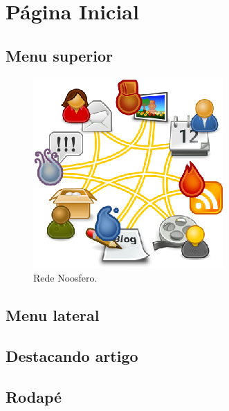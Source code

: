 \chapter{Página Inicial}
\label{chap:paginaInicial}


\section{Menu superior}
\begin{figure}[h]
     \centering
       \includegraphics[keepaspectratio=true,scale=0.49]{figuras/rede-noosfero}
     \caption{Rede Noosfero.}
\end{figure}

\section{Menu lateral}

\section{Destacando artigo}

\section{Rodapé}